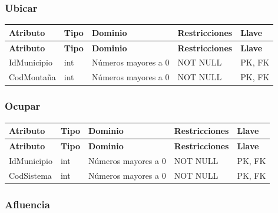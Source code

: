 \subsubsection*{Ubicar}

\begin{longtable}{p{2.2cm} p{2.2cm} p{5.8cm} p{4.2cm} p{1.5cm}}
\toprule
\textbf{Atributo} & \textbf{Tipo} & \textbf{Dominio} & \textbf{Restricciones} & \textbf{Llave} \\
\midrule
\endfirsthead

\toprule
\textbf{Atributo} & \textbf{Tipo} & \textbf{Dominio} & \textbf{Restricciones} & \textbf{Llave} \\
\midrule
\endhead

\bottomrule
\endfoot

IdMunicipio
& int
& Números mayores a 0
& NOT NULL
& PK, FK \\

CodMontaña
& int
& Números mayores a 0
& NOT NULL
& PK, FK \\

\end{longtable}


\subsubsection*{Ocupar}

\begin{longtable}{p{2.2cm} p{2.2cm} p{5.8cm} p{4.2cm} p{1.5cm}}
\toprule
\textbf{Atributo} & \textbf{Tipo} & \textbf{Dominio} & \textbf{Restricciones} & \textbf{Llave} \\
\midrule
\endfirsthead

\toprule
\textbf{Atributo} & \textbf{Tipo} & \textbf{Dominio} & \textbf{Restricciones} & \textbf{Llave} \\
\midrule
\endhead

\bottomrule
\endfoot


IdMunicipio
& int
& Números mayores a 0
& NOT NULL
& PK, FK \\

CodSistema
& int
& Números mayores a 0
& NOT NULL
& PK, FK \\

\end{longtable}


\subsubsection*{Afluencia}

